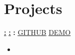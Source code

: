 \documentclass[letterpaper, 11pt]{article}
\newcommand{\bulletSpace}{\vspace{-5pt}}
\newcommand{\secStartSpace}{\vspace{3pt}}
\newcommand{\spaceCollapse}{\vspace{-5pt}}
\begin{document}
\section{\color{black} \textbf{Projects}}
\secStartSpace
\begin{addmargin}[0em]{1em}

    \noindent
    \href{\VAR{ project.demoUrl }}{\textbf{:}}
    \href{\VAR{ project.demoUrl }}{\textbf{:}}
    \textbf{:}
    \hfill
     \href{\VAR{ project.githubUrl }}{\underline{GITHUB}}
     \href{\VAR{ project.demoUrl }}{\underline{DEMO}}

    \noindent {} \spaceCollapse
    \begin{itemize}[leftmargin=1.5em]
    \item {} \bulletSpace
    \end{itemize}
\end{addmargin}

% 
%

\end{document}

